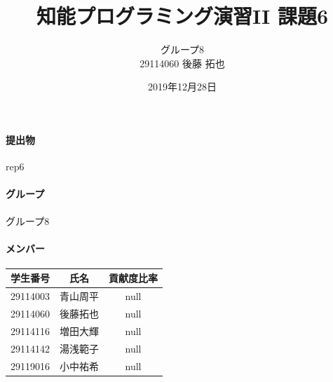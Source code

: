 \documentclass[uplatex,12pt]{jsarticle}
\title{知能プログラミング演習II 課題6}
\author{グループ8\\
  29114060 後藤 拓也\\
}
\date{2019年12月28日}
\begin{document}
\maketitle

\paragraph{提出物} rep6
\paragraph{グループ} グループ8

\paragraph{メンバー}
\begin{tabular}{|c|c|c|}
  \hline
  学生番号&氏名&貢献度比率\\
  \hline\hline
  29114003&青山周平&null\\
  \hline
  29114060&後藤拓也&null\\
  \hline
  29114116&増田大輝&null\\
  \hline
  29114142&湯浅範子&null\\
  \hline
  29119016&小中祐希&null\\
  \hline
\end{tabular}
\end{document}
